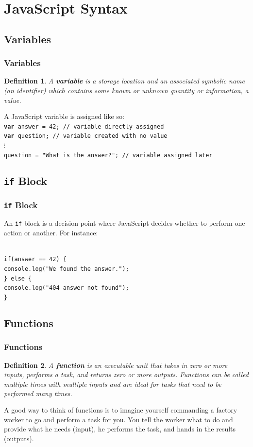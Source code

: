 \documentclass[aspectratio=169]{beamer}
\newtheorem{defn}{Definition}
\begin{document}
\section{JavaScript Syntax}
\subsection{Variables}
\begin{frame}
\frametitle{Variables}
\begin{defn}
A \textbf{variable} is a storage location and an associated symbolic name (an identifier) which contains some known or unknown quantity or information, a value. \cite{wiki-variable}
\end{defn}
\pause
A JavaScript variable is assigned like so:\\
\texttt{\textbf{var} answer = 42; // variable directly assigned\\
\textbf{var} question; // variable created with no value\\
\quad\quad$\vdots$\\
question = "What is the answer?"; // variable assigned later}
\end{frame}

\subsection{\texttt{if} Block}
\begin{frame}
\frametitle{\texttt{if} Block}
An \texttt{if} block is a decision point where JavaScript decides whether to perform one action or another. For instance:

\pause
\mbox{}\\
\texttt{if(answer == 42) \{\\
\quad console.log("We found the answer.");\\
\} else \{\\
\quad console.log("404 answer not found");\\
\}
}
\end{frame}

\subsection{Functions}
\begin{frame}
\frametitle{Functions}
\begin{defn}
A \textbf{function} is an executable unit that takes in zero or more inputs, performs a task, and returns zero or more outputs. Functions can be called multiple times with multiple inputs and are ideal for tasks that need to be performed many times.
\end{defn}

\pause
A good way to think of functions is to imagine yourself commanding a factory worker to go and perform a task for you. You tell the worker what to do and provide what he needs (input), he performs the task, and hands in the results (outputs).
\end{frame}
\end{document}

